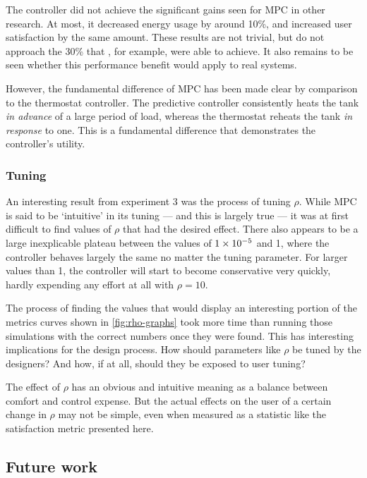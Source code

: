 The controller did not achieve the significant gains seen for MPC in other research.
At most, it decreased energy usage by around 10\%, and increased user satisfaction by the same amount.
These results are not trivial, but do not approach the 30\% that , for example, were able to achieve.
It also remains to be seen whether this performance benefit would apply to real systems.

However, the fundamental difference of MPC has been made clear by comparison to the thermostat controller.
The predictive controller consistently heats the tank \emph{in advance} of a large period of load, whereas the thermostat reheats the tank \emph{in response} to one.
This is a fundamental difference that demonstrates the controller's utility.

\subsubsection{Tuning}

An interesting result from experiment 3 was the process of tuning $\rho$.
While MPC is said to be `intuitive' in its tuning --- and this is largely true --- it was at first difficult to find values of $\rho$ that had the desired effect.
There also appears to be a large inexplicable plateau between the values of $1\times 10^{-5}$ and 1, where the controller behaves largely the same no matter the tuning parameter.
For larger values than 1, the controller will start to become conservative very quickly, hardly expending any effort at all with $\rho=10$.

The process of finding the values that would display an interesting portion of the metrics curves shown in \autoref{fig:rho-graphs} took more time than running those simulations with the correct numbers once they were found.
This has interesting implications for the design process.
How should parameters like $\rho$ be tuned by the designers?
And how, if at all, should they be exposed to user tuning?

The effect of $\rho$ has an obvious and intuitive meaning as a balance between comfort and control expense.
But the actual effects on the user of a certain change in $\rho$ may not be simple, even when measured as a statistic like the satisfaction metric presented here.

\subsection{Future work}

